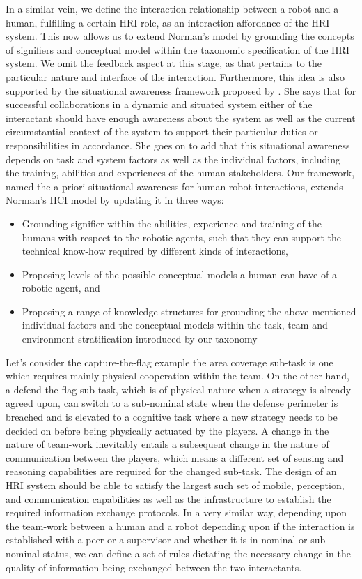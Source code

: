 \documentclass[letterpaper, 10 pt, conference]{ieeeconf} %
\theoremstyle{definition} \newtheorem{definition}{Definition}
\begin{document}
In a similar vein, we define the interaction relationship between a robot and a
human, fulfilling a certain HRI role, as an interaction affordance of the HRI
system. This now allows us to extend Norman's model by grounding the concepts of
signifiers and conceptual model within the taxonomic specification of the HRI
system. We omit the feedback aspect at this stage, as that pertains to the
particular nature and interface of the interaction. Furthermore, this idea is also
supported by the situational awareness framework proposed by
\textcite{Endsley1995}. She says that for successful collaborations in a
dynamic and situated system either of the interactant should have enough
awareness about the system as well as the current circumstantial context of the
system to support their particular duties or responsibilities in accordance. She
goes on to add that this situational awareness depends on task and system
factors as well as the individual factors, including the training, abilities and
experiences of the human stakeholders. Our framework, named the a priori
situational awareness for human-robot interactions, extends Norman's HCI
model by updating it in three ways:
\begin{itemize}
      \item Grounding signifier within the abilities, experience and training of
      the humans with respect to the robotic agents, such that they can support
      the technical know-how required by different kinds of interactions, 
      \item Proposing levels of the possible conceptual models a human can
      have of a robotic agent, and
      \item Proposing a range of knowledge-structures for grounding the above
      mentioned individual factors and the conceptual models within the task,
      team and environment stratification introduced by our taxonomy
\end{itemize}

Let's consider the capture-the-flag example the area coverage sub-task is one
which requires mainly physical cooperation within the team. On the other
hand, a defend-the-flag sub-task, which is of physical nature when a strategy
is already agreed upon, can switch to a sub-nominal state when the defense
perimeter is breached and is elevated to a cognitive task where a new
strategy needs to be decided on before being physically actuated by the
players. A change in the nature of team-work inevitably entails a subsequent
change in the nature of communication between the players, which means a
different set of sensing and reasoning capabilities are required for the
changed sub-task. The design of an HRI system should be able to satisfy the
largest such set of mobile, perception, and communication capabilities as
well as the infrastructure to establish the required information exchange
protocols. In a very similar way, depending upon the team-work between a
human and a robot depending upon if the interaction is established with a
peer or a supervisor and whether it is in nominal or sub-nominal status, we
can define a set of rules dictating the necessary change in the quality of
information being exchanged between the two interactants.
\end{document}
